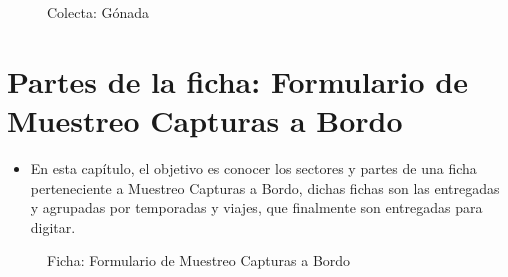 \documentclass[a4paper,oneside,11pt]{book}
\begin{document}
\begin{itemize}
\begin{figure} [!h]
\begin{center}
\caption{Colecta: Gónada}
\end{center}
\end{figure}

\end{itemize}
 
\chapter {Partes de la ficha: Formulario de Muestreo Capturas a Bordo}
 
\begin{itemize}
\item  En esta capítulo, el objetivo es conocer los sectores y partes de una ficha perteneciente a Muestreo Capturas a Bordo, dichas fichas son las entregadas y agrupadas por temporadas y viajes, que finalmente son entregadas para digitar.
\end{itemize}

 
 \begin{figure} [!h]
 \begin{center}
 \caption{Ficha: Formulario de Muestreo Capturas a Bordo}
 \end{center}
 \end{figure}
 
\end{document}
